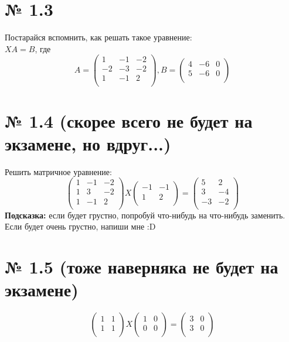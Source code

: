 \documentclass[a4paper,11pt]{report}
\begin{document}
\section{№ 1.3}
Постарайся вспомнить, как решать такое уравнение:\\
$XA = B$, где
\[
A = 
\begin{pmatrix}
1 & -1 & -2\\
-2 & -3 & -2\\
1 & -1 & 2\\
\end{pmatrix},
B = 
\begin{pmatrix}
4 & -6 & 0\\
5 & -6 & 0\\
\end{pmatrix}
\]
\section{№ 1.4 (скорее всего не будет на экзамене, но вдруг...)}
Решить матричное уравнение:
\[
\begin{pmatrix}
1 & -1 & -2\\
1 & 3 & -2\\
1 & -1 & 2\\
\end{pmatrix}
X
\begin{pmatrix}
-1 & -1\\
1 & 2\\
\end{pmatrix}
=
\begin{pmatrix}
5 & 2\\
3 & -4\\
-3 & -2\\
\end{pmatrix}
\]
\textbf{Подсказка:} если будет грустно, попробуй что-нибудь на что-нибудь заменить. Если будет очень грустно,
напиши мне :D
\section{№ 1.5 (тоже наверняка не будет на экзамене)}
\[
\begin{pmatrix}
1 & 1\\
1 & 1\\
\end{pmatrix}
X
\begin{pmatrix}
1 & 0\\
0 & 0\\
\end{pmatrix}
=
\begin{pmatrix}
3 & 0\\
3 & 0\\
\end{pmatrix}
\]
\end{document}

